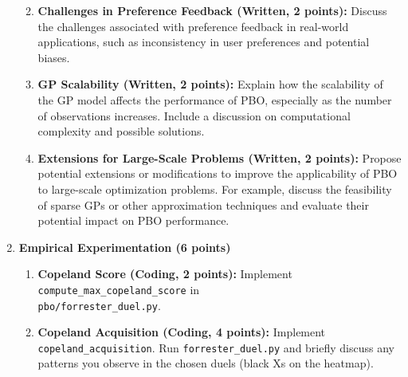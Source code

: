 \documentclass[
  letterpaper,
  numbers=noenddot,
  DIV=11]{scrreprt}
\theoremstyle{plain}
\theoremstyle{definition}
\theoremstyle{remark}
\begin{document}
\begin{enumerate}
  \begin{enumerate}
  \def\labelenumii{(\roman{enumii})}
  \item
    \textbf{Challenges in Preference Feedback (Written, 2 points):}
    Discuss the challenges associated with preference feedback in
    real-world applications, such as inconsistency in user preferences
    and potential biases.
  \item
    \textbf{GP Scalability (Written, 2 points):} Explain how the
    scalability of the GP model affects the performance of PBO,
    especially as the number of observations increases. Include a
    discussion on computational complexity and possible solutions.
  \item
    \textbf{Extensions for Large-Scale Problems (Written, 2 points):}
    Propose potential extensions or modifications to improve the
    applicability of PBO to large-scale optimization problems. For
    example, discuss the feasibility of sparse GPs or other
    approximation techniques and evaluate their potential impact on PBO
    performance.
  \end{enumerate}
\item
  \textbf{Empirical Experimentation (6 points)}

  \begin{enumerate}
  \def\labelenumii{(\roman{enumii})}
  \item
    \textbf{Copeland Score (Coding, 2 points):} Implement
    \texttt{compute\_max\_copeland\_score} in\\
    \texttt{pbo/forrester\_duel.py}.
  \item
    \textbf{Copeland Acquisition (Coding, 4 points):} Implement
    \texttt{copeland\_acquisition}. Run \texttt{forrester\_duel.py} and
    briefly discuss any patterns you observe in the chosen duels (black
    Xs on the heatmap).
  \end{enumerate}
\end{enumerate}
\end{document}
